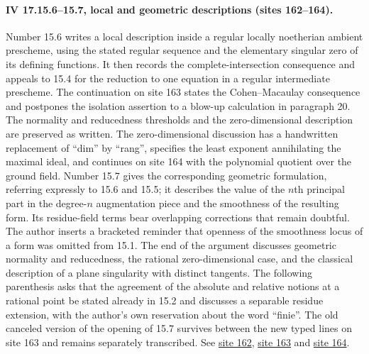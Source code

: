 \paragraph{IV 17.15.6--15.7, local and geometric descriptions (sites 162--164).}
Number 15.6 writes a local description inside a regular locally noetherian ambient prescheme, using the stated regular sequence and the elementary singular zero of its defining functions. It then records the complete-intersection consequence and appeals to 15.4 for the reduction to one equation in a regular intermediate prescheme. The continuation on site 163 states the Cohen--Macaulay consequence and postpones the isolation assertion to a blow-up calculation in paragraph 20. The normality and reducedness thresholds and the zero-dimensional description are preserved as written. The zero-dimensional discussion has a handwritten replacement of ``dim'' by ``rang'', specifies the least exponent annihilating the maximal ideal, and continues on site 164 with the polynomial quotient over the ground field. Number 15.7 gives the corresponding geometric formulation, referring expressly to 15.6 and 15.5; it describes the value of the $n$th principal part in the degree-$n$ augmentation piece and the smoothness of the resulting form. Its residue-field terms bear overlapping corrections that remain doubtful. The author inserts a bracketed reminder that openness of the smoothness locus of a form was omitted from 15.1. The end of the argument discusses geometric normality and reducedness, the rational zero-dimensional case, and the classical description of a plane singularity with distinct tangents. The following parenthesis asks that the agreement of the absolute and relative notions at a rational point be stated already in 15.2 and discusses a separable residue extension, with the author's own reservation about the word ``finie''. The old canceled version of the opening of 15.7 survives between the new typed lines on site 163 and remains separately transcribed. See \href{https://grothendieck.umontpellier.fr/web/viewer.html?file=../25.pdf#page=163}{site 162}, \href{https://grothendieck.umontpellier.fr/web/viewer.html?file=../25.pdf#page=164}{site 163} and \href{https://grothendieck.umontpellier.fr/web/viewer.html?file=../25.pdf#page=165}{site 164}.

